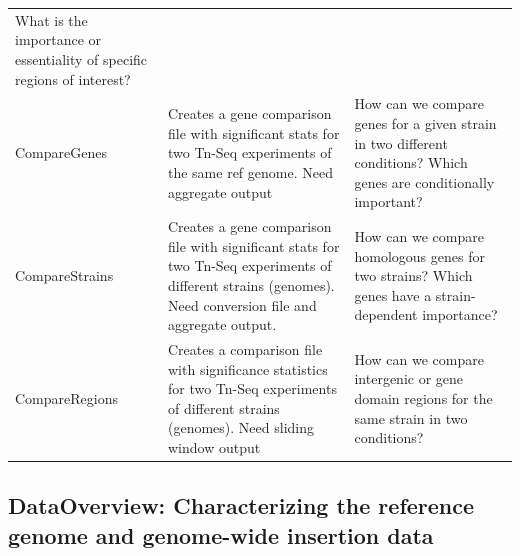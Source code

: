 \documentclass[11pt,]{article}
\begin{document}
\begin{longtable}[]{@{}lll@{}}
\begin{minipage}[t]{0.38\columnwidth}
What is the importance or essentiality of specific regions of
interest?\strut
\end{minipage}\tabularnewline
\begin{minipage}[t]{0.13\columnwidth}\raggedright\strut
CompareGenes\strut
\end{minipage} & \begin{minipage}[t]{0.40\columnwidth}\raggedright\strut
Creates a gene comparison file with significant stats for two Tn-Seq
experiments of the same ref genome. Need aggregate output\strut
\end{minipage} & \begin{minipage}[t]{0.38\columnwidth}\raggedright\strut
How can we compare genes for a given strain in two different conditions?
Which genes are conditionally important?\strut
\end{minipage}\tabularnewline
\begin{minipage}[t]{0.13\columnwidth}\raggedright\strut
CompareStrains\strut
\end{minipage} & \begin{minipage}[t]{0.40\columnwidth}\raggedright\strut
Creates a gene comparison file with significant stats for two Tn-Seq
experiments of different strains (genomes). Need conversion file and
aggregate output.\strut
\end{minipage} & \begin{minipage}[t]{0.38\columnwidth}\raggedright\strut
How can we compare homologous genes for two strains? Which genes have a
strain-dependent importance?\strut
\end{minipage}\tabularnewline
\begin{minipage}[t]{0.13\columnwidth}\raggedright\strut
CompareRegions\strut
\end{minipage} & \begin{minipage}[t]{0.40\columnwidth}\raggedright\strut
Creates a comparison file with significance statistics for two Tn-Seq
experiments of different strains (genomes). Need sliding window
output\strut
\end{minipage} & \begin{minipage}[t]{0.38\columnwidth}\raggedright\strut
How can we compare intergenic or gene domain regions for the same strain
in two conditions?\strut
\end{minipage}\tabularnewline
\bottomrule
\end{longtable}

\subsection{DataOverview: Characterizing the reference genome and
genome-wide insertion
data}\label{dataoverview-characterizing-the-reference-genome-and-genome-wide-insertion-data}
\end{document}
